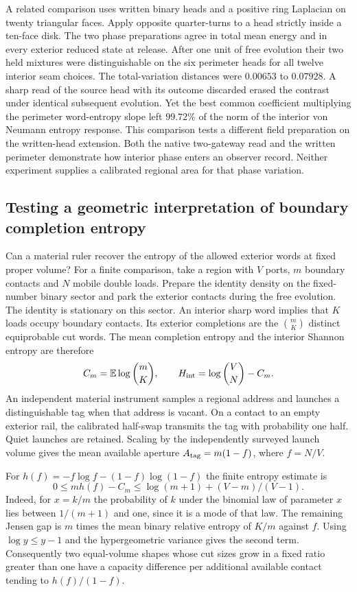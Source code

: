\documentclass[11pt]{article}
\begin{document}
A related comparison uses written binary heads and a positive ring
Laplacian on twenty triangular faces. Apply opposite quarter-turns to
a head strictly inside a ten-face disk. The two phase preparations agree
in total mean energy and in every exterior reduced state at release.
After one unit of free evolution their two held mixtures were
distinguishable on the six perimeter heads for all twelve interior seam
choices. The total-variation distances were $0.00653$ to $0.07928$.
A sharp read of the source head with its outcome discarded erased the
contrast under identical subsequent evolution. Yet the best common
coefficient multiplying the perimeter word-entropy slope left $99.72\%$
of the norm of the interior von Neumann entropy response. This
comparison tests a different field preparation on the written-head
extension. Both the native two-gateway read and the written perimeter
demonstrate how interior phase enters an observer record. Neither
experiment supplies a calibrated regional area for that phase variation.

\subsection{Testing a geometric interpretation of boundary completion entropy}

Can a material ruler recover the entropy of the allowed exterior words
at fixed proper volume? For a finite comparison, take a region with
$V$ ports, $m$ boundary contacts and $N$ mobile double loads. Prepare
the identity density on the fixed-number binary sector and park the
exterior contacts during the free evolution. The identity is stationary
on this sector. An interior sharp word implies that $K$ loads occupy
boundary contacts. Its exterior completions are the $\binom mK$
distinct equiprobable cut words. The mean completion entropy and the
interior Shannon entropy are therefore
\[
 C_m=\mathbb E\log\binom mK,\qquad H_{\rm int}=\log\binom VN-C_m .
\]
An independent material instrument samples a regional address and
launches a distinguishable tag when that address is vacant. On a
contact to an empty exterior rail, the calibrated half-swap transmits
the tag with probability one half. Quiet launches are retained. Scaling
by the independently surveyed launch volume gives the mean available
aperture $A_{\rm tag}=m(1-f)$, where $f=N/V$.

For $h(f)=-f\log f-(1-f)\log(1-f)$ the finite entropy estimate is
\[
 0\le m h(f)-C_m\le \log(m+1)+(V-m)/(V-1).
\]
Indeed, for $x=k/m$ the probability of $k$ under the binomial law of
parameter $x$ lies between $1/(m+1)$ and one, since it is a mode of that
law. The remaining Jensen gap is $m$ times the mean binary relative
entropy of $K/m$ against $f$. Using $\log y\le y-1$ and the
hypergeometric variance gives the second term. Consequently two
equal-volume shapes whose cut sizes grow in a fixed ratio greater than
one have a capacity difference per additional available contact tending
to $h(f)/(1-f)$.
\end{document}
